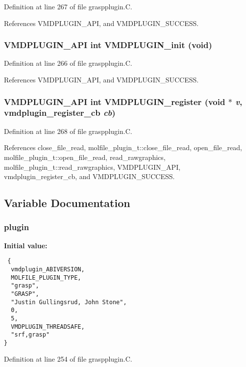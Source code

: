 Definition at line 267 of file graspplugin.C.

References VMDPLUGIN\_\-API, and VMDPLUGIN\_\-SUCCESS.
\subsubsection{\setlength{\rightskip}{0pt plus 5cm}VMDPLUGIN\_\-API int VMDPLUGIN\_\-init (void)}\label{graspplugin_8C_a6}




Definition at line 266 of file graspplugin.C.

References VMDPLUGIN\_\-API, and VMDPLUGIN\_\-SUCCESS.
\subsubsection{\setlength{\rightskip}{0pt plus 5cm}VMDPLUGIN\_\-API int VMDPLUGIN\_\-register (void $\ast$ {\em v}, {\bf vmdplugin\_\-register\_\-cb} {\em cb})}\label{graspplugin_8C_a8}




Definition at line 268 of file graspplugin.C.

References close\_\-file\_\-read, molfile\_\-plugin\_\-t::close\_\-file\_\-read, open\_\-file\_\-read, molfile\_\-plugin\_\-t::open\_\-file\_\-read, read\_\-rawgraphics, molfile\_\-plugin\_\-t::read\_\-rawgraphics, VMDPLUGIN\_\-API, vmdplugin\_\-register\_\-cb, and VMDPLUGIN\_\-SUCCESS.

\subsection{Variable Documentation}
\subsubsection{ plugin\hspace{0.3cm}{\tt  [static]}}\label{graspplugin_8C_a1}


{\bf Initial value:}

\footnotesize\begin{verbatim} {
  vmdplugin_ABIVERSION,               
  MOLFILE_PLUGIN_TYPE,                
  "grasp",                            
  "GRASP",                            
  "Justin Gullingsrud, John Stone",   
  0,                                  
  5,                                  
  VMDPLUGIN_THREADSAFE,               
  "srf,grasp"                         
}\end{verbatim}\normalsize 


Definition at line 254 of file graspplugin.C.